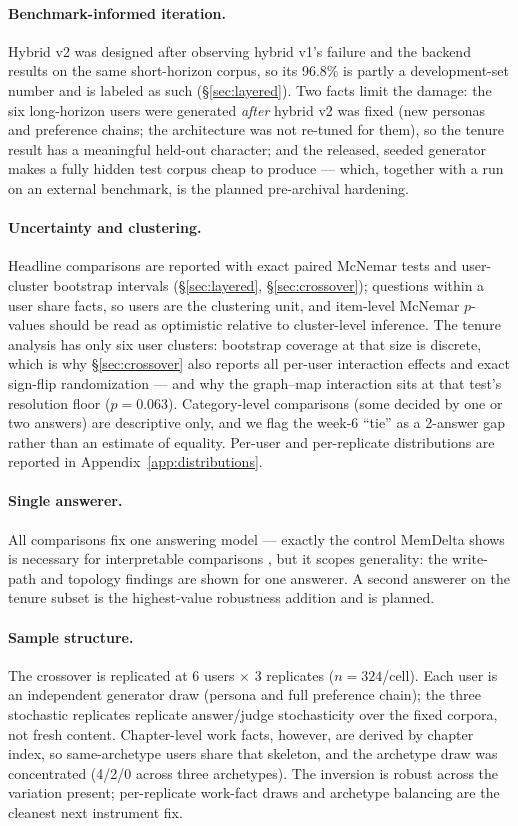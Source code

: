\paragraph{Benchmark-informed iteration.} Hybrid v2 was designed after
observing hybrid v1's failure and the backend results on the same
short-horizon corpus, so its 96.8\% is partly a development-set number and
is labeled as such (\S\ref{sec:layered}). Two facts limit the damage: the
six long-horizon users were generated \emph{after} hybrid v2 was fixed
(new personas and preference chains; the architecture was not re-tuned for
them), so the tenure result has a meaningful held-out character; and the
released, seeded generator makes a fully hidden test corpus cheap to
produce --- which, together with a run on an external benchmark, is the
planned pre-archival hardening.

\paragraph{Uncertainty and clustering.} Headline comparisons are reported
with exact paired McNemar tests and user-cluster bootstrap intervals
(\S\ref{sec:layered}, \S\ref{sec:crossover}); questions within a user share
facts, so users are the clustering unit, and item-level McNemar $p$-values
should be read as optimistic relative to cluster-level inference. The
tenure analysis has only six user clusters: bootstrap coverage at that size
is discrete, which is why \S\ref{sec:crossover} also reports all per-user
interaction effects and exact sign-flip randomization --- and why the
graph--map interaction sits at that test's resolution floor ($p=0.063$).
Category-level comparisons (some decided by one or two answers) are
descriptive only, and we flag the week-6 ``tie'' as a 2-answer gap rather
than an estimate of equality. Per-user and per-replicate distributions are
reported in Appendix~\ref{app:distributions}.

\paragraph{Single answerer.} All comparisons fix one answering model ---
exactly the control MemDelta shows is necessary for interpretable
comparisons \citep{wang2026memdelta}, but it scopes generality: the
write-path and topology findings are shown for one answerer. A second
answerer on the tenure subset is the highest-value robustness addition and
is planned.

\paragraph{Sample structure.} The crossover is replicated at 6 users
$\times$ 3 replicates ($n{=}324$/cell). Each user is an independent generator
draw (persona and full preference chain); the three stochastic replicates replicate
answer/judge stochasticity over the fixed corpora, not fresh content.
Chapter-level work facts, however, are derived by chapter index, so
same-archetype users share that skeleton, and the archetype draw was
concentrated (4/2/0 across three archetypes). The
inversion is robust across the variation present; per-replicate work-fact draws
and archetype balancing are the cleanest next instrument fix.

